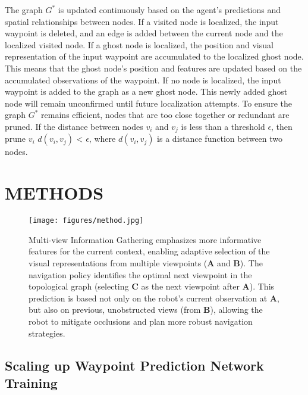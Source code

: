 The graph $G^*$ is updated continuously based on the agent’s predictions and spatial relationships between nodes. If a visited node is localized, the input waypoint is deleted, and an edge is added between the current node and the localized visited node. If a ghost node is localized, the position and visual representation of the input waypoint are accumulated to the localized ghost node. This means that the ghost node’s position and features are updated based on the accumulated observations of the waypoint. If no node is localized, the input waypoint is added to the graph as a new ghost node. This newly added ghost node will remain unconfirmed until future localization attempts.
To ensure the graph $G^*$ remains efficient, nodes that are too close together or redundant are pruned. If the distance between nodes \( v_i \) and \( v_j \) is less than a threshold \( \epsilon \), then 
prune \(v_i\)  \( d(v_i, v_j) \) < \( \epsilon \), where \( d(v_i, v_j) \) is a distance function between two nodes.



\section{METHODS}

\begin{figure*}[t]
      \centering
      \texttt{[image: figures/method.jpg]}
      \vspace{-10pt}
      \caption{Multi-view Information Gathering emphasizes more informative features for the current context, enabling adaptive selection of the visual representations from multiple viewpoints (\textbf{A} and \textbf{B}). The navigation policy identifies the optimal next viewpoint in the topological graph (selecting \textbf{C} as the next viewpoint after \textbf{A}). This prediction is based not only on the robot's current observation at \textbf{A}, but also on previous, unobstructed views (from \textbf{B}), allowing the robot to mitigate occlusions and plan more robust navigation strategies.}
      \label{teaser}
    \vspace{-15pt}
\end{figure*}

\subsection{Scaling up Waypoint Prediction Network Training}

